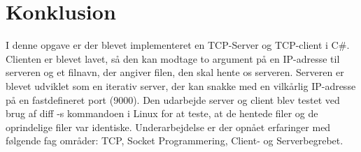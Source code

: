 \chapter{Konklusion}\label{ch:konclusion}
I denne opgave er der blevet implementeret en TCP-Server og TCP-client i C{\#}. Clienten er blevet lavet, så den kan modtage to argument på en IP-adresse til serveren og et filnavn, der angiver filen, den skal hente os serveren. Serveren er blevet udviklet som en iterativ server, der kan snakke med en vilkårlig IP-adresse på en fastdefineret port (9000). 
Den udarbejde server og client blev testet ved brug af diff -s kommandoen i Linux for at teste, at de hentede filer og de oprindelige filer var identiske.
Underarbejdelse er der opnået erfaringer med følgende fag områder: TCP, Socket Programmering, Client- og Serverbegrebet.